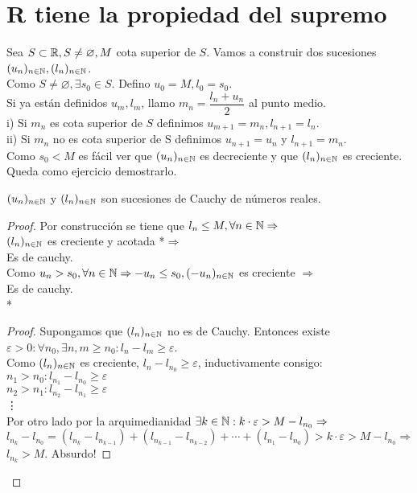\section{R tiene la propiedad del supremo}

Sea $S \subset \mathbb{R}, S \neq \varnothing, M$ cota superior de $S$. Vamos a construir dos sucesiones $(u_n)_{n \in \mathbb{N}}, (l_n)_{n \in \mathbb{N}}$. \\
Como $S \neq \varnothing, \exists s_0 \in S$. Defino $u_0 = M, l_0 = s_0$. \\
Si ya están definidos $u_m, l_m$, llamo $m_n = \dfrac{l_n+u_n}{2}$ al punto medio. \\
i) Si $m_n$ es cota superior de $S$ definimos $u_{m+1} = m_n, l_{n+1} = l_n$. \\
ii) Si $m_n$ no es cota superior de S definimos $u_{n+1} = u_n$ y $l_{n+1} = m_n$. \\
Como $s_0 < M$ es fácil ver que $(u_n)_{n \in \mathbb{N}}$ es decreciente y que $(l_n)_{n \in \mathbb{N}}$ es creciente. Queda como ejercicio demostrarlo.

\begin{lemma}
  $(u_n)_{n \in \mathbb{N}}$ y $(l_n)_{n \in \mathbb{N}}$ son sucesiones de Cauchy de números reales.
  \begin{proof}
    Por construcción se tiene que $l_n \leq M, \forall n \in \mathbb{N} \Rightarrow$ \\
    $(l_n)_{n \in \mathbb{N}}$ es creciente y acotada *$\Rightarrow$ \\
    Es de cauchy. \\

    Como $u_n > s_0, \forall n \in \mathbb{N} \Rightarrow -u_n \leq s_0, (-u_n)_{n \in \mathbb{N}}$ es creciente $\Rightarrow$ \\
    Es de cauchy. \\

    * \begin{proof}
      Supongamos que $(l_n)_{n \in \mathbb{N}}$ no es de Cauchy. Entonces existe $\varepsilon > 0 : \forall n_0, \exists n, m \geq n_0 : l_n - l_m \geq \varepsilon$. \\
      Como $(l_n)_{n \in \mathbb{N}}$ es creciente, $l_n - l_{n_0} \geq \varepsilon$, inductivamente consigo: \\
      $n_1 > n_0 : l_{n_1} - l_{n_0} \geq \varepsilon$ \\
      $n_2 > n_1 : l_{n_2} - l_{n_1} \geq \varepsilon$ \\
      \vdots \\

      Por otro lado por la arquimedianidad $\exists k \in \mathbb{N} : k \cdot \varepsilon > M - l_{n_0} \Rightarrow$ \\
      $l_{n_k} - l_{n_0} = (l_{n_k} - l_{n_{k-1}}) + (l_{n_{k-1}} - l_{n_{k-2}}) + \cdots + (l_{n_1} - l_{n_0}) > k \cdot \varepsilon > M - l_{n_0} \Rightarrow$ \\
      $l_{n_k} > M$. Absurdo!
    \end{proof}
  \end{proof}
\end{lemma}

